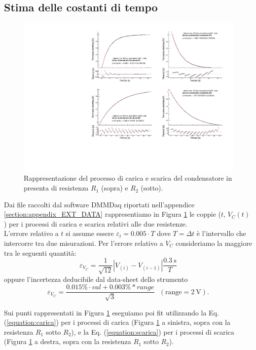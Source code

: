 \documentclass[italian, a4paper, 10pt, twocolumn]{../../style/lab_unige}
\newcommand{\reffig}[1]{Figura {\ref{#1}}}%
\newcommand{\refeqn}[1]{Eq. ({\ref{#1}})}%
\newcommand{\mstdErr}[1]{\varepsilon_{#1}}
\begin{document}
    



    \subsection{Stima delle costanti di tempo}

    \begin{figure}[t!]
        \centering
        \includegraphics[width=\linewidth]{plot_RC.pdf}
        \caption{Rappresentazione del processo di carica e scarica del condensatore in presenta di resistenza $R_1$ (sopra) e $R_2$ (sotto). }
        \label{figure:plot_RC}
    \end{figure}

    Dai file raccolti dal software DMMDaq riportati nell'appendice \ref{section:appendix_EXT_DATA} rappresentiamo in \reffig{figure:plot_RC} le coppie ($t$, $V_C(t)$) per i processi di carica e scarica relativi alle due resistenze. \\
    L'errore relativo a $t$ si assume essere $\mstdErr{t}=0.005\cdot T$ dove $T=\Delta t$ è l'intervallo che intercorre tra due misurazioni. Per l'errore relativo a $V_C$ consideriamo la maggiore tra le seguenti quantità: 
    \[
        \mstdErr{V_C} = \frac{1}{\sqrt{12}}\left|V_{(i)}-V_{(i-1)}\right|\frac{0.3~\text{s}}{T}  
    \]oppure l'incertezza deducibile dal data-sheet dello strumento
    \[
        \mstdErr{V_C}=\frac{0.015\% \cdot val + 0.003\% * range}{\sqrt{3}}~~~(\text{range}=2~\text{V}).
    \]

    Sui punti rappresentati in \reffig{figure:plot_RC} eseguiamo poi fit utilizzando la \refeqn{equation:carica} per i processi di carica (\reffig{figure:plot_RC} a sinistra, sopra con la resistenza $R_1$ sotto $R_2$), e la \refeqn{equation:scarica} per i processi di scarica (\reffig{figure:plot_RC} a destra, sopra con la resistenza $R_1$ sotto $R_2$).
\end{document}
